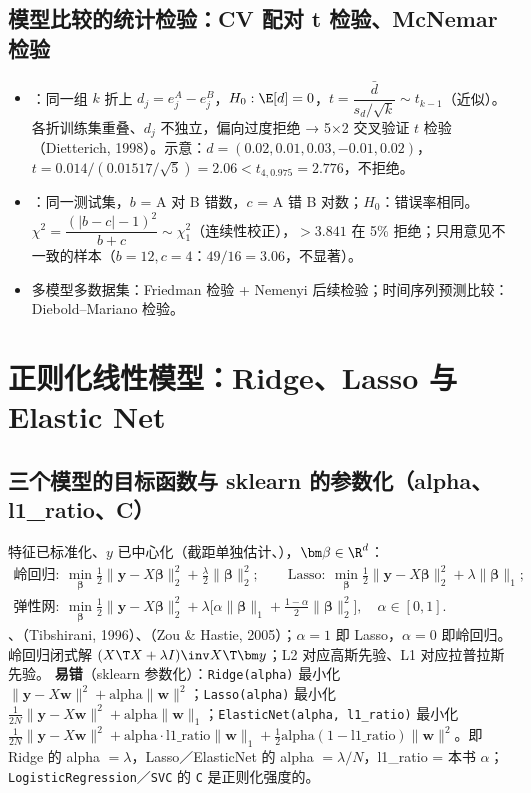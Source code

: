 \subsection{模型比较的统计检验：CV 配对 t 检验、McNemar 检验}
\begin{itemize}
\item {}：同一组 $k$ 折上 $d_j=e^A_j-e^B_j$，$H_0:\E[d]=0$，$t=\dfrac{\bar d}{s_d/\sqrt k}\sim t_{k-1}$（近似）。各折训练集重叠、$d_j$ 不独立，偏向过度拒绝 → 5×2 交叉验证 $t$ 检验（Dietterich, 1998）。示意：$d=(0.02,0.01,0.03,-0.01,0.02)$，$t=0.014/(0.01517/\sqrt5)=2.06<t_{4,0.975}=2.776$，不拒绝。
\item {}：同一测试集，$b$ = A 对 B 错数，$c$ = A 错 B 对数；$H_0$：错误率相同。$\chi^2=\dfrac{(|b-c|-1)^2}{b+c}\sim\chi^2_1$（连续性校正），$>3.841$ 在 5\% 拒绝；只用意见不一致的样本（$b=12,c=4$：$49/16=3.06$，不显著）。
\item 多模型多数据集：Friedman 检验 + Nemenyi 后续检验；时间序列预测比较：Diebold–Mariano 检验。
\end{itemize}

\section{正则化线性模型：Ridge、Lasso 与 Elastic Net}

\subsection{三个模型的目标函数与 sklearn 的参数化（alpha、l1\_ratio、C）}
特征已标准化、$y$ 已中心化（截距单独估计、），$\bm\beta\in\R^d$：
\begin{gather*}
\text{岭回归}:\ \min_{\bm\beta}\tfrac12\|\bm y-X\bm\beta\|_2^2+\tfrac\lambda2\|\bm\beta\|_2^2;\qquad
\text{Lasso}:\ \min_{\bm\beta}\tfrac12\|\bm y-X\bm\beta\|_2^2+\lambda\|\bm\beta\|_1;\\
\text{弹性网}:\ \min_{\bm\beta}\tfrac12\|\bm y-X\bm\beta\|_2^2+\lambda\Big[\alpha\|\bm\beta\|_1+\tfrac{1-\alpha}2\|\bm\beta\|_2^2\Big],\quad\alpha\in[0,1].
\end{gather*}
、（Tibshirani, 1996）、（Zou \& Hastie, 2005）；$\alpha=1$ 即 Lasso，$\alpha=0$ 即岭回归。岭回归闭式解 $(X\T X+\lambda I)\inv X\T\bm y$；L2 对应高斯先验、L1 对应拉普拉斯先验。
\textbf{易错}（sklearn 参数化）：\texttt{Ridge(alpha)} 最小化 $\|\bm y-X\bm w\|^2+\text{alpha}\|\bm w\|^2$；\texttt{Lasso(alpha)} 最小化 $\frac1{2N}\|\bm y-X\bm w\|^2+\text{alpha}\|\bm w\|_1$；\texttt{ElasticNet(alpha, l1\_ratio)} 最小化 $\frac1{2N}\|\bm y-X\bm w\|^2+\text{alpha}\cdot\text{l1\_ratio}\|\bm w\|_1+\frac12\text{alpha}(1-\text{l1\_ratio})\|\bm w\|^2$。即 Ridge 的 alpha $=\lambda$，Lasso／ElasticNet 的 alpha $=\lambda/N$，l1\_ratio = 本书 $\alpha$；\texttt{LogisticRegression}／\texttt{SVC} 的 \texttt{C} 是正则化强度的。


